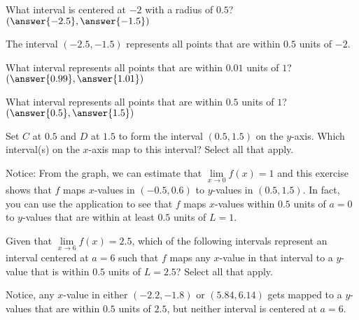 \documentclass{ximera}
\begin{document}
\begin{exercise}
    \begin{question}
    	What interval is centered at $-2$ with a radius of $ 0.5$? $\left( \answer{-2.5}, \answer{-1.5}\right)$
    	\begin{feedback}
    		The interval $(-2.5, -1.5)$ represents all points that are within $0.5$ units of $-2$.
    	\end{feedback}
    \end{question}
    \begin{question}
    	What interval represents all points that are within $0.01$ units of $1$?  $\left( \answer{0.99}, \answer{1.01} \right)$
    \end{question}
 	\begin{question}
 		What interval represents all points that are within $0.5$ units of $1$?  $\left( \answer{0.5}, \answer{1.5}\right)$
		\begin{question}
 			Set $C$ at $0.5$ and $D$ at $1.5$ to form the interval $(0.5, 1.5)$ on the $y$-axis.  Which interval(s) on the $x$-axis map to this interval? Select all that apply.
 			\begin{selectAll}
 			\end{selectAll}
 		    \begin{feedback}
 		    	Notice: From the graph, we can estimate that $\lim\limits_{x \to 0}f(x)=1$ and this exercise shows that $f$ maps $x$-values in $(-0.5, 0.6)$ to $y$-values in $(0.5, 1.5)$.  In fact, you can use the application to see that $f$ maps $x$-values within $0.5$ units of $a=0$ to $y$-values that are within at least $0.5$ units of $L=1$.
 		    \end{feedback}
  		\end{question}	
 	\end{question}
 	\begin{question}
 		Given that $\lim\limits_{x \to 6}f(x)=2.5$, which of the following intervals represent an interval centered at $a=6$ such that $f$ maps any $x$-value in that interval to a $y$-value that is within $0.5$ units of $L=2.5$?  Select all that apply.
 		\begin{selectAll}
 			\choice{$(-2.2, -1.8)$}
 			\choice[correct]{$(5.9, 6.1)$}
 			\choice{$(5.84, 6.14)$}
 			\choice[correct]{$(5.95, 6.05)$}
 		\end{selectAll}
 		\begin{feedback}
 			Notice, any $x$-value in either $(-2.2, -1.8)$ or $ (5.84, 6.14) $ gets mapped to a $y$-values that are within $0.5$ units of $2.5$, but neither interval is centered at $a=6$.
 			

\end{feedback}
\end{question}
\end{exercise}
\end{document}
